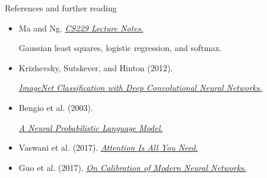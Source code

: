 
\begin{frame}[t]{References and further reading}
\small
\begin{itemize}\setlength{\itemsep}{.20cm}
\item Ma and Ng. \href{https://cs229.stanford.edu/main_notes.pdf}{\textit{CS229 Lecture Notes}.}\par
Gaussian least squares, logistic regression, and softmax.
\item Krizhevsky, Sutskever, and Hinton (2012).\par
\href{https://proceedings.neurips.cc/paper_files/paper/2012/file/c399862d3b9d6b76c8436e924a68c45b-Paper.pdf}{\textit{ImageNet Classification with Deep Convolutional Neural Networks}.}
\item Bengio et al. (2003).\par
\href{https://www.jmlr.org/papers/volume3/bengio03a/bengio03a.pdf}{\textit{A Neural Probabilistic Language Model}.}
\item Vaswani et al. (2017). \href{https://arxiv.org/abs/1706.03762}{\textit{Attention Is All You Need}.}
\item Guo et al. (2017). \href{https://proceedings.mlr.press/v70/guo17a.html}{\textit{On Calibration of Modern Neural Networks}.}
\end{itemize}
\end{frame}
